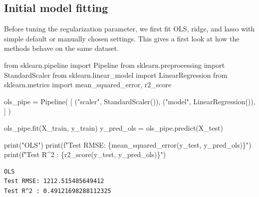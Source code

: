 \documentclass[
  letterpaper,
  DIV=11,
  numbers=noendperiod]{scrreprt}
\newenvironment{Shaded}{\begin{snugshade}}{\end{snugshade}}
\newcommand{\BuiltInTok}[1]{\textcolor[rgb]{0.00,0.23,0.31}{#1}}
\newcommand{\ImportTok}[1]{\textcolor[rgb]{0.00,0.46,0.62}{#1}}
\newcommand{\NormalTok}[1]{\textcolor[rgb]{0.00,0.23,0.31}{#1}}
\newcommand{\OperatorTok}[1]{\textcolor[rgb]{0.37,0.37,0.37}{#1}}
\newcommand{\SpecialCharTok}[1]{\textcolor[rgb]{0.37,0.37,0.37}{#1}}
\newcommand{\SpecialStringTok}[1]{\textcolor[rgb]{0.13,0.47,0.30}{#1}}
\newcommand{\StringTok}[1]{\textcolor[rgb]{0.13,0.47,0.30}{#1}}
\theoremstyle{definition}
\theoremstyle{definition}
\theoremstyle{plain}
\theoremstyle{plain}
\theoremstyle{remark}
\begin{document}
\subsection{Initial model fitting}\label{initial-model-fitting}

Before tuning the regularization parameter, we first fit OLS, ridge, and
lasso with simple default or manually chosen settings. This gives a
first look at how the methods behave on the same dataset.

\begin{Shaded}
\begin{Highlighting}[]
\ImportTok{from}\NormalTok{ sklearn.pipeline }\ImportTok{import}\NormalTok{ Pipeline}
\ImportTok{from}\NormalTok{ sklearn.preprocessing }\ImportTok{import}\NormalTok{ StandardScaler}
\ImportTok{from}\NormalTok{ sklearn.linear\_model }\ImportTok{import}\NormalTok{ LinearRegression}
\ImportTok{from}\NormalTok{ sklearn.metrics }\ImportTok{import}\NormalTok{ mean\_squared\_error, r2\_score}

\NormalTok{ols\_pipe }\OperatorTok{=}\NormalTok{ Pipeline(}
\NormalTok{    [}
\NormalTok{        (}\StringTok{"scaler"}\NormalTok{, StandardScaler()),}
\NormalTok{        (}\StringTok{"model"}\NormalTok{, LinearRegression()),}
\NormalTok{    ]}
\NormalTok{)}

\NormalTok{ols\_pipe.fit(X\_train, y\_train)}
\NormalTok{y\_pred\_ols }\OperatorTok{=}\NormalTok{ ols\_pipe.predict(X\_test)}

\BuiltInTok{print}\NormalTok{(}\StringTok{"OLS"}\NormalTok{)}
\BuiltInTok{print}\NormalTok{(}\SpecialStringTok{f"Test RMSE: }\SpecialCharTok{\{}\NormalTok{mean\_squared\_error(y\_test, y\_pred\_ols)}\SpecialCharTok{\}}\SpecialStringTok{"}\NormalTok{)}
\BuiltInTok{print}\NormalTok{(}\SpecialStringTok{f"Test R\^{}2 : }\SpecialCharTok{\{}\NormalTok{r2\_score(y\_test, y\_pred\_ols)}\SpecialCharTok{\}}\SpecialStringTok{"}\NormalTok{)}
\end{Highlighting}
\end{Shaded}

\begin{verbatim}
OLS
Test RMSE: 1212.515485649412
Test R^2 : 0.49121698288112325
\end{verbatim}
\end{document}
